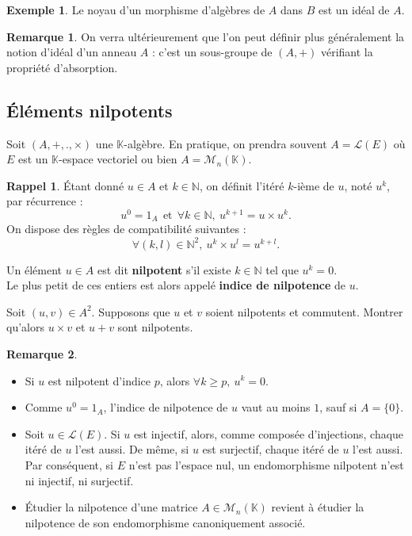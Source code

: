 \documentclass[french]{article}
\newcommand{\N}{\mathbb{N}}
\newcommand{\K}{\mathbb{K}}
\theoremstyle{plain}
\theoremstyle{definition}
\newtheorem*{ex}{Exemple}
\newtheorem*{rmq}{Remarque}
\newtheorem*{rappel}{Rappel}
\theoremstyle{remark}
\begin{document}
\begin{ex}
	Le noyau d'un morphisme d'algèbres de $A$ dans $B$ est un idéal de $A$.
\end{ex}

\begin{rmq}
	On verra ultérieurement que l'on peut définir plus généralement la notion d'idéal d'un anneau $A$ : c'est un sous-groupe de $(A,+)$ vérifiant la propriété d'absorption.
\end{rmq}

\subsection{Éléments nilpotents}

Soit $(A,+,.,\times)$ une $\K$-algèbre. En pratique, on prendra souvent $A=\mathcal{L}(E)$ où $E$ est un $\K$-espace vectoriel ou bien $A=\mathcal{M}_n(\K)$.

\begin{rappel}
	Étant donné $u\in A$ et $k\in\N$, on définit l'itéré $k$-ième de $u$, noté $u^k$, par récurrence : $$u^0=1_A\ \ \text{et}\ \ \forall k\in\N,\ u^{k+1}=u\times u^k.$$ On dispose des règles de compatibilité suivantes : $$\forall (k,l)\in\N^2,\ u^k\times u^l=u^{k+l}.$$
\end{rappel}

\begin{dfn}
	Un élément $u\in A$ est dit \textbf{nilpotent} s'il existe $k\in\N$ tel que $u^k=0$. \\ Le plus petit de ces entiers est alors appelé \textbf{indice de nilpotence} de $u$.
\end{dfn}

\begin{exo}
	Soit $(u,v)\in A^2$. Supposons que $u$ et $v$ soient nilpotents et commutent. Montrer qu'alors $u\times v$ et $u+v$ sont nilpotents.
\end{exo}

\begin{rmq}
	\begin{itemize}
		\item Si $u$ est nilpotent d'indice $p$, alors $\forall k\geqslant p,\ u^k=0$.
		\item Comme $u^0=1_A$, l'indice de nilpotence de $u$ vaut au moins $1$, sauf si $A=\{0\}$.
		\item Soit $u\in\mathcal{L}(E)$. Si $u$ est injectif, alors, comme composée d'injections, chaque itéré de $u$ l'est aussi. De même, si $u$ est surjectif, chaque itéré de $u$ l'est aussi. Par conséquent, si $E$ n'est pas l'espace nul, un endomorphisme nilpotent n'est ni injectif, ni surjectif.
		\item \'Etudier la nilpotence d'une matrice $A\in\mathcal{M}_n(\K)$ revient à étudier la nilpotence de son endomorphisme canoniquement associé.
	\end{itemize}
\end{rmq}
\end{document}
